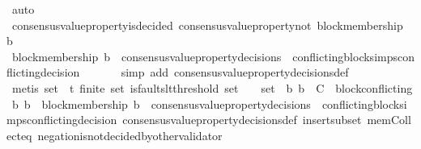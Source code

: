 \begin{isabellebody}
\ auto\isanewline
\ \ \ \isamarkupfalse%
\ {\isachardoublequoteopen}consensus{\isacharunderscore}value{\isacharunderscore}property{\isacharunderscore}is{\isacharunderscore}decided\ {\isacharparenleft}consensus{\isacharunderscore}value{\isacharunderscore}property{\isacharunderscore}not\ {\isacharparenleft}block{\isacharunderscore}membership\ b{}{\isacharparenright}{\isacharcomma}\ {\isasymsigma}{\isacharprime}{\isacharparenright}{\isachardoublequoteclose}\isanewline
\ \ \ \ \ \isamarkupfalse%
\ {\isacartoucheopen}block{\isacharunderscore}membership\ b{}\ {\isasymin}\ consensus{\isacharunderscore}value{\isacharunderscore}property{\isacharunderscore}decisions\ {\isasymsigma}{\isacharprime}{\isacartoucheclose}\ conflicting{\isacharunderscore}blocks{\isacharunderscore}imps{\isacharunderscore}conflicting{\isacharunderscore}decision\isanewline
\ \ \ \ \ \isamarkupfalse%
\ {\isacharparenleft}simp\ add{\isacharcolon}\ consensus{\isacharunderscore}value{\isacharunderscore}property{\isacharunderscore}decisions{\isacharunderscore}def{\isacharparenright}\isanewline
\ \ \ \ \ \isamarkupfalse%
\ {\isacharparenleft}metis\ {\isacartoucheopen}{\isasymsigma}{\isacharunderscore}set\ {\isasymsubseteq}\ {\isasymSigma}t{\isacartoucheclose}\ {\isacartoucheopen}finite\ {\isasymsigma}{\isacharunderscore}set{\isacartoucheclose}\ {\isacartoucheopen}is{\isacharunderscore}faults{\isacharunderscore}lt{\isacharunderscore}threshold\ {\isacharparenleft}{\isasymUnion}{\isasymsigma}{\isacharunderscore}set{\isacharparenright}{\isacartoucheclose}\ {\isacartoucheopen}{\isacharbraceleft}{\isasymsigma}{\isacharcomma}\ {\isasymsigma}{\isacharprime}{\isacharbraceright}\ {\isasymsubseteq}\ {\isasymsigma}{\isacharunderscore}set\ {\isasymand}\ {\isacharbraceleft}b{}{\isacharcomma}\ b{}{\isacharbraceright}\ {\isasymsubseteq}\ C\ {\isasymand}\ block{\isacharunderscore}conflicting\ {\isacharparenleft}b{}{\isacharcomma}\ b{}{\isacharparenright}\ {\isasymand}\ block{\isacharunderscore}membership\ b{}\ {\isasymin}\ consensus{\isacharunderscore}value{\isacharunderscore}property{\isacharunderscore}decisions\ {\isasymsigma}{\isacartoucheclose}\ conflicting{\isacharunderscore}blocks{\isacharunderscore}imps{\isacharunderscore}conflicting{\isacharunderscore}decision\ consensus{\isacharunderscore}value{\isacharunderscore}property{\isacharunderscore}decisions{\isacharunderscore}def\ insert{\isacharunderscore}subset\ mem{\isacharunderscore}Collect{\isacharunderscore}eq\ negation{\isacharunderscore}is{\isacharunderscore}not{\isacharunderscore}decided{\isacharunderscore}by{\isacharunderscore}other{\isacharunderscore}validator{\isacharparenright}\ \isanewline

\end{isabellebody}
